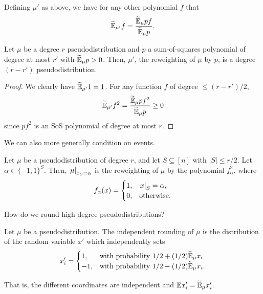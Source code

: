 	Defining $\mu'$ as above, we have for any other polynomial $f$ that
	\[ \widetilde{\mathbb{E}}_{\mu'} f = \frac{\widetilde{\mathbb{E}}_\mu pf}{\widetilde{\mathbb{E}}_\mu p}. \]

	\begin{fprop}
		Let $\mu$ be a degree $r$ pseudodistribution and $p$ a sum-of-squares polynomial of degree at most $r'$ with $\widetilde{\mathbb{E}}_\mu p > 0$. Then, $\mu'$, the reweighting of $\mu$ by $p$, is a degree $(r-r')$ pseudodistribution.
	\end{fprop}
	\begin{proof}
		We clearly have $\widetilde{\mathbb{E}}_{\mu'} 1 = 1$. For any function $f$ of degree $\le (r-r')/2$,
		\[ \widetilde{\mathbb{E}}_{\mu'} f^2 = \frac{\widetilde{\mathbb{E}}_{\mu} pf^2}{\widetilde{\mathbb{E}}_\mu p} \ge 0 \]
		since $pf^2$ is an SoS polynomial of degree at most $r$.
	\end{proof}

	We can also more generally condition on events.

	\begin{fdef}[Conditioning]
		Let $\mu$ be a pseudodistribution of degree $r$, and let $S \subseteq [n]$ with $|S| \le r/2$. Let $\alpha \in \{-1,1\}^S$. Then, $\left.\mu\right|_{x_S = \alpha}$ is the reweighting of $\mu$ by the polynomial $f_\alpha^2$, where
		\[ f_\alpha(x) = \begin{cases} 1, & \left.x\right|_{S} = \alpha, \\ 0, & \text{otherwise.} \end{cases} \]
	\end{fdef}

	How do we round high-degree pseudodistributions?

	\begin{fdef}
		Let $\mu$ be a pseudodistribution. The independent rounding of $\mu$ is the distribution of the random variable $x'$ which independently sets
		\[ x_i' = \begin{cases} 1, & \text{with probability $1/2 + (1/2)\widetilde{\mathbb{E}}_\mu x_i$} \\ -1, & \text{with probability $1/2 - (1/2)\widetilde{\mathbb{E}}_\mu x_i$.} \end{cases} \]
	\end{fdef}
	That is, the different coordinates are independent and $\mathbb{E} x_i' = \widetilde{\mathbb{E}}_\mu x_i'$.

